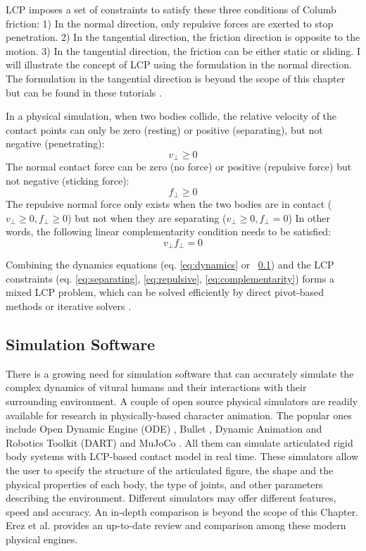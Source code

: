 LCP imposes a set of constraints to satisfy these three conditions of Columb friction: 1) In the normal direction, only repulsive forces are exerted to stop penetration. 2) In the tangential direction, the friction direction is opposite to the motion. 3) In the tangential direction, the friction can be either static or sliding. I will illustrate the concept of LCP using the formulation in the normal direction. The formulation in the tangential direction is beyond the scope of this chapter but can be found in these tutorials \cite{}. 

In a physical simulation, when two bodies collide, the relative velocity of the contact points can only be zero (resting) or positive (separating), but not negative (penetrating):
\begin{equation}
v_\perp\geq 0
\label{eq:separating}
\end{equation}
The normal contact force can be zero (no force) or positive (repulsive force) but not negative (sticking force):
\begin{equation}
f_\perp \geq 0
\label{eq:repulsive}
\end{equation}
The repulsive normal force only exists when the two bodies are in contact ($v_\perp\geq 0, f_\perp\geq 0$)
but not when they are separating ($v_\perp \geq 0, f_\perp =0$)
In other words, the following linear complementarity condition needs to be satisfied:
\begin{equation}
v_\perp f_\perp =0
\label{eq:complementarity}
\end{equation}

Combining the dynamics equations (eq. \ref{eq:dynamics} or ~\ref{}) and the LCP constraints (eq. \ref{eq:separating}, \ref{eq:repulsive}, \ref{eq:complementarity}) forms a mixed LCP problem, which can be solved efficiently by direct pivot-based methods \cite{} or iterative solvers \cite{}. 


\subsection{Simulation Software}

There is a growing need for simulation software that can accurately simulate the complex dynamics of vitural humans and their interactions with their surrounding environment. A couple of open source physical simulators are readily available for research in physically-based character animation. The popular ones include Open Dynamic Engine (ODE) \cite{}, Bullet \cite{}, Dynamic Animation and Robotics Toolkit (DART) \cite{} and MuJoCo \cite{}. All them can simulate articulated rigid body systems with LCP-based contact model in real time. These simulators allow the user to specify the structure of the articulated figure, the shape and the physical properties of each body, the type of joints, and other parameters describing the environment. Different simulators may offer different features, speed and accuracy. An in-depth comparison is beyond the scope of this Chapter. Erez et al.\cite{} provides an up-to-date review and comparison among these modern physical engines.
